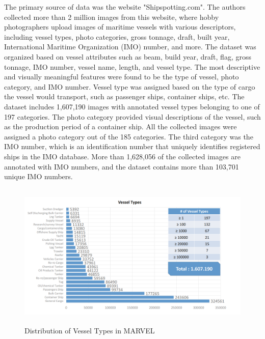 The primary source of data was the website "Shipspotting.com"\cite{ship_website}. The authors collected more than 2 million images from this website, where hobby photographers upload images of maritime vessels with various descriptors, including vessel types, photo categories, gross tonnage, draft, built year, International Maritime Organization (IMO) number, and more. The dataset was organized based on vessel attributes such as beam, build year, draft, flag, gross tonnage, IMO number, vessel name, length, and vessel type. The most descriptive and visually meaningful features were found to be the type of vessel, photo category, and IMO number. Vessel type was assigned based on the type of cargo the vessel would transport, such as passenger ships, container ships, etc. The dataset includes 1,607,190 images with annotated vessel types belonging to one of 197 categories. The photo category provided visual descriptions of the vessel, such as the production period of a container ship. All the collected images were assigned a photo category out of the 185 categories. The third category was the IMO number, which is an identification number that uniquely identifies registered ships in the IMO database. More than 1,628,056 of the collected images are annotated with IMO numbers, and the dataset contains more than 103,701 unique IMO numbers.
\begin{figure}[H]
    \centering
    \includegraphics[width=\textwidth,height=7cm,keepaspectratio=true]{src/Images/marvel_types.PNG}
    \caption{
     Distribution of Vessel Types in MARVEL\cite{gundogdu2017marvel}
     }
\end{figure}
\\

